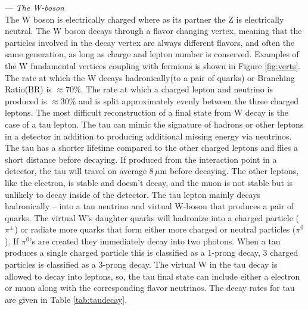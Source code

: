 --- \textit{The W-boson }\\
 The W boson is electrically charged where as its partner the Z is electrically neutral. The W boson decays through a flavor changing vertex, meaning that the particles involved in the decay vertex are always different flavors, and often the same generation, as long as charge and lepton number is conserved. Examples of the W fundamental vertices coupling with fermions is shown in Figure \ref{fig:verts}. The rate at which the W decays hadronically(to a pair of quarks) or Branching Ratio(BR) is $\approx 70\%$. The rate at which a charged lepton and neutrino is produced is $\approx30\%$ and is split approximately evenly between the three charged leptons. The most difficult reconstruction of a final state from W decay is the case of a tau lepton. The tau can mimic the signature of hadrons or other leptons in a detector in addition to producing additional missing energy via neutrinos. The tau has a shorter lifetime compared to the other charged leptons and flies a short distance before decaying. If produced from the interaction point in a detector, the tau will travel on average $8\,\mu\text{m}$ before decaying. The other leptons, like the electron, is stable and doesn't decay, and the muon is not stable but is unlikely to decay inside of the detector. The tau lepton mainly decays hadronically -- into a tau neutrino and virtual W-boson that produces a pair of quarks. The virtual W's daughter quarks will hadronize into a charged particle ($\pi^\pm$) or radiate more quarks that form either more charged or neutral particles ($\pi^0$). If $\pi^0$'s are created they immediately decay into two photons. When a tau produces a single charged particle this is classified as a 1-prong decay, 3 charged particles is classified as a 3-prong decay. The virtual W in the tau decay is allowed to decay into leptons, so, the tau final state can include either a electron or muon along with the corresponding flavor neutrinos. The decay rates for tau are given in Table \ref{tab:taudecay}.
